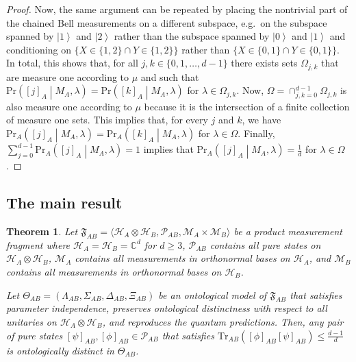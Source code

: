 \documentclass[DIV=calc,fontsize=12pt]{scrartcl} %
\theoremstyle{definition}
\theoremstyle{plain}
\newtheorem{theorem}[definition]{Theorem}
\newcommand{\Ket}[1]{\ensuremath{\left \vert #1 \right \rangle}}
\newcommand{\Proj}[1]{\ensuremath{\left [ #1 \right ]}}
\newcommand{\Hilb}[1][]{\ensuremath{\mathcal{H}_{#1}}}
\newcommand{\Tr}[2][]{\ensuremath{\text{Tr}_{#1} \left ( #2 \right )}}
\begin{document}
\begin{proof}
Now, the same argument can be repeated by placing the nontrivial
part of the chained Bell measurements on a different subspace, e.g.\
on the subspace spanned by $\Ket{1}$ and $\Ket{2}$ rather than the
subspace spanned by $\Ket{0}$ and $\Ket{1}$ and conditioning on $\{X
\in \{1,2\} \cap Y \in \{1,2\}\}$ rather than $\{X \in \{0,1\} \cap
Y \in \{0,1\}\}$.  In total, this shows that, for all $j,k \in
\{0,1,\ldots,d-1\}$ there exists sets $\Omega_{j,k}$ that are
measure one according to $\mu$ and such that $\text{Pr} \left (
\Proj{j}_A \middle | M_A, \lambda \right ) = \text{Pr} \left (
\Proj{k}_A \middle | M_A, \lambda \right )$ for $\lambda \in
\Omega_{j,k}$.  Now, $\Omega = \cap_{j,k = 0}^{d-1} \Omega_{j,k}$ is
also measure one according to $\mu$ because it is the intersection
of a finite collection of measure one sets.  This implies that, for
every $j$ and $k$, we have $\text{Pr}_A \left ( \Proj{j}_A \middle |
M_A, \lambda \right ) = \text{Pr}_A \left ( \Proj{k}_A \middle |
M_A, \lambda \right )$ for $\lambda \in \Omega$.  Finally,
$\sum_{j=0}^{d-1} \text{Pr}_A \left ( \Proj{j}_A \middle | M_A,
\lambda \right ) = 1$ implies that $\text{Pr}_A \left ( \Proj{j}_A
\middle | M_A, \lambda \right ) = \frac{1}{d}$ for $\lambda \in
\Omega$.
\end{proof}

\subsection{The main result}

\label{CR:Main}

\begin{theorem}
\label{thm:CR:CR}
Let $\mathfrak{F}_{AB} = \langle \Hilb[A] \otimes \Hilb[B],
\mathcal{P}_{AB}, \mathcal{M}_A \times \mathcal{M}_B \rangle$ be a
product measurement fragment where $\Hilb[A] = \Hilb[B] =
\mathbb{C}^d$ for $d \geq 3$, $\mathcal{P}_{AB}$ contains all pure
states on $\Hilb[A] \otimes \Hilb[B]$, $\mathcal{M}_A$ contains all
measurements in orthonormal bases on $\Hilb[A]$, and $\mathcal{M}_B$
contains all measurements in orthonormal bases on $\Hilb[B]$.

Let $\Theta_{AB} = (\Lambda_{AB}, \Sigma_{AB}, \Delta_{AB},
\Xi_{AB})$ be an ontological model of $\mathfrak{F}_{AB}$ that
satisfies parameter independence, preserves ontological distinctness
with respect to all unitaries on $\Hilb[A] \otimes \Hilb[B]$, and
reproduces the quantum predictions.  Then, any pair of pure states
$\Proj{\psi}_{AB}, \Proj{\phi}_{AB} \in \mathcal{P}_{AB}$ that
satisfies $\Tr[AB]{\Proj{\phi}_{AB}\Proj{\psi}_{AB}} \leq
\frac{d-1}{d}$ is ontologically distinct in $\Theta_{AB}$.
\end{theorem}
\end{document}
